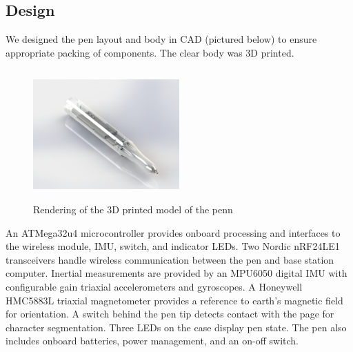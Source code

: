 \documentclass{article}
\begin{document}
\subsection{Design}
We designed the pen layout and body in CAD (pictured below) to ensure appropriate packing of components. The clear body was 3D printed.
\begin{figure}[H]
\centering
    \includegraphics[width=0.5\textwidth, height= 5cm]{pen_render.png}
    \caption{Rendering of the 3D printed model of the penn}
\end{figure}

An ATMega32u4 microcontroller provides onboard processing and interfaces to the wireless module, IMU, switch, and indicator LEDs. Two Nordic nRF24LE1 transceivers handle wireless communication between the pen and base station computer. Inertial measurements are provided by an MPU6050 digital IMU with configurable gain triaxial accelerometers and gyroscopes. A Honeywell HMC5883L triaxial magnetometer provides a reference to earth's magnetic field for orientation. A switch behind the pen tip detects contact with the page for character segmentation. Three LEDs on the case display pen state. The pen also includes onboard batteries, power management, and an on-off switch.
\end{document}
